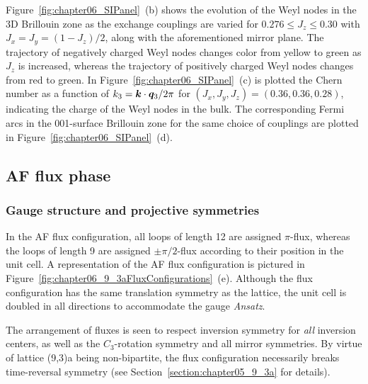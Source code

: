 Figure~\ref{fig:chapter06_SIPanel}~(b) shows the evolution of the Weyl nodes in the 3D Brillouin zone as the exchange couplings are varied for $0.276 \leq J_z \leq 0.30$ with $J_x = J_y = (1 - J_z)/2$, along with the aforementioned mirror plane.
The trajectory of negatively charged Weyl nodes changes color from yellow to green as $J_z$ is increased, whereas the trajectory of positively charged Weyl nodes changes from red to green.
In Figure~\ref{fig:chapter06_SIPanel}~(c) is plotted the Chern number as a function of $k_3 = \bm{k} \cdot \bm{q}_3 / 2\pi$ for $(J_x, J_y, J_z) = (0.36, 0.36, 0.28)$, indicating the charge of the Weyl nodes in the bulk.
The corresponding Fermi arcs in the 001-surface Brillouin zone for the same choice of couplings are plotted in Figure~\ref{fig:chapter06_SIPanel}~(d).


%
%
\subsection{AF flux phase}
\label{section:chapter06_AFPhase}
%
%
\subsubsection{Gauge structure and projective symmetries}
%
%
In the AF flux configuration, all loops of length 12 are assigned $\pi$-flux, whereas the loops of length 9 are assigned $\pm \pi/2$-flux according to their position in the unit cell.
A representation of the AF flux configuration is pictured in Figure~\ref{fig:chapter06_9_3aFluxConfigurations}~(e).
Although the flux configuration has the same translation symmetry as the lattice, the unit cell is doubled in all directions to accommodate the gauge \textit{Ansatz}.

The arrangement of fluxes is seen to respect inversion symmetry for \textit{all} inversion centers, as well as the $C_3$-rotation symmetry and all mirror symmetries.
By virtue of lattice (9,3)a being non-bipartite, the flux configuration necessarily breaks time-reversal symmetry (see Section~\ref{section:chapter05_9_3a} for details).

